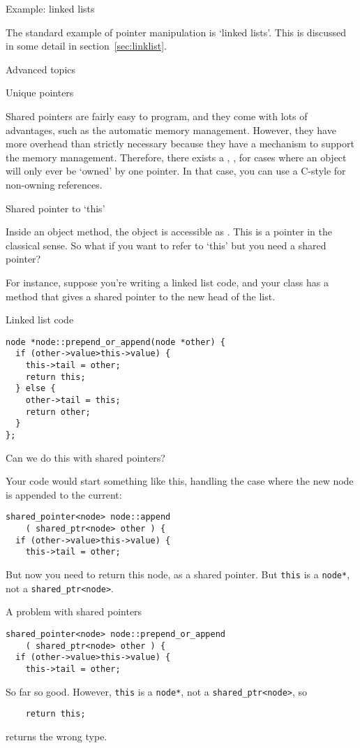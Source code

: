  {Example: linked lists}

The standard example of pointer manipulation is `linked lists'. This
is discussed in some detail in section~\ref{sec:linklist}.

 {Advanced topics}

 {Unique pointers}

Shared pointers are fairly easy to program, and they come with lots of
advantages, such as the automatic memory management. However, they
have more overhead than strictly necessary because they have a
 mechanism to support the memory
management. Therefore, there exists a ,
, for cases where an object will only ever be
`owned' by one pointer. In that case, you can use a C-style
 for non-owning references.

 {Shared pointer to `this'}

Inside an object method, the object is accessible as
. This is a pointer in the classical sense. So what
if you want to refer to `this' but you need a shared pointer?

For instance, suppose you're writing a linked list code, and your
 class has a method  that gives a shared
pointer to the new head of the list.

\begin{slide}{Linked list code}
  \label{sl:share-ptr-node}  
\begin{lstlisting}
node *node::prepend_or_append(node *other) {
  if (other->value>this->value) {
    this->tail = other;
    return this;
  } else {
    other->tail = this;
    return other;
  }
};
\end{lstlisting}
Can we do this with shared pointers?
\end{slide}

Your code would start something
like this, handling the case where the new node is appended to the current:
\begin{lstlisting}
shared_pointer<node> node::append
    ( shared_ptr<node> other ) {
  if (other->value>this->value) {
    this->tail = other;
\end{lstlisting}
But now you need to return this node, as a shared pointer. But
\lstinline{this} is a \lstinline{node*}, not a \lstinline{shared_ptr<node>}.

\begin{slide}{A problem with shared pointers}
  \label{sl:share-ptr-node-sh}
\begin{lstlisting}
shared_pointer<node> node::prepend_or_append
    ( shared_ptr<node> other ) {
  if (other->value>this->value) {
    this->tail = other;
\end{lstlisting}
So far so good. However, \lstinline{this} is a \lstinline{node*}, not a
\lstinline{shared_ptr<node>}, so
\begin{lstlisting}
    return this;
\end{lstlisting}
returns the wrong type.
\end{slide}

